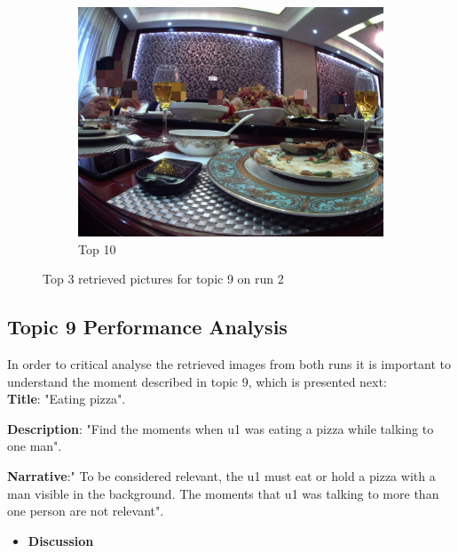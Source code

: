 \begin{figure}[H]
\begin{subfigure}{0.32\textwidth}
        \includegraphics[width=\textwidth]{Sections/7Results/images/run2top10.jpg}\hfill
        \caption{Top 10}
      \end{subfigure}
    \caption{Top 3 retrieved pictures for topic 9 on run 2}
    \label{fig:run2}
  \end{figure}





  \newpage

  \subsection{Topic 9 Performance Analysis}
  \label{sec:analysis}

  In order to critical analyse the retrieved images from both runs it is important to understand the moment described in topic 9, which is presented next:\\
  

  
  \textbf{Title}: "Eating pizza".
  
  \textbf{Description}: "Find the moments when u1 was eating a pizza
  while talking to one man".
  
  \textbf{Narrative}:" To be considered relevant, the u1 must eat or
  hold a pizza with a man visible in the background. The moments that
  u1 was talking to more than one person are not relevant".\\
  
  \begin{itemize}
    \item \textbf{Discussion}
  \end{itemize}
  
